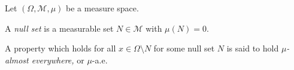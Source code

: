 %
%
%
%
\begin{definition}
  Let $\left(\Omega,\mathcal{M},\mu\right)$ be a measure space.\newline

  A \textit{null set} is a measurable set $N\in \mathcal{M}$ with $\mu\left(N\right) = 0$.\newline

  A property which holds for all $x\in \Omega\setminus N$ for some null set $N$ is said to hold \textit{$\mu$-almost everywhere,} or $\mu$-a.e.
\end{definition}

